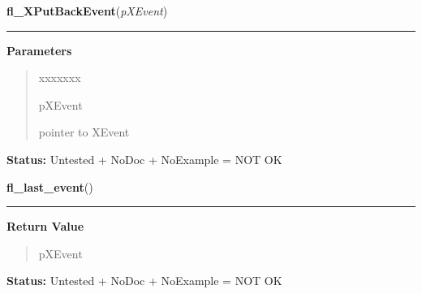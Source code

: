     \label{xformslib:library:fl_XPutBackEvent}

    \vspace{0.5ex}

\hspace{.8\funcindent}\begin{boxedminipage}{\funcwidth}

    \raggedright \textbf{fl\_XPutBackEvent}(\textit{pXEvent})

    \vspace{-1.5ex}

    \rule{\textwidth}{0.5\fboxrule}
\setlength{\parskip}{2ex}
\setlength{\parskip}{1ex}
      \textbf{Parameters}
      \vspace{-1ex}

      \begin{quote}
        \begin{Ventry}{xxxxxxx}

          \item[pXEvent]

          pointer to XEvent

        \end{Ventry}

      \end{quote}

\textbf{Status:} Untested + NoDoc + NoExample = NOT OK



    \end{boxedminipage}

    \label{xformslib:library:fl_last_event}

    \vspace{0.5ex}

\hspace{.8\funcindent}\begin{boxedminipage}{\funcwidth}

    \raggedright \textbf{fl\_last\_event}()

    \vspace{-1.5ex}

    \rule{\textwidth}{0.5\fboxrule}
\setlength{\parskip}{2ex}
\setlength{\parskip}{1ex}
      \textbf{Return Value}
    \vspace{-1ex}

      \begin{quote}
      pXEvent

      \end{quote}

\textbf{Status:} Untested + NoDoc + NoExample = NOT OK



    \end{boxedminipage}

